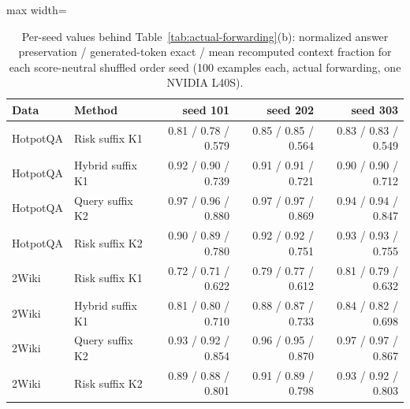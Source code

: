 \begin{table}[t]
\centering
\footnotesize
\begin{adjustbox}{max width=\textwidth}
\begin{tabular}{llrrr}
\toprule
Data & Method & seed 101 & seed 202 & seed 303 \\
\midrule
HotpotQA & Risk suffix K1 & 0.81 / 0.78 / 0.579 & 0.85 / 0.85 / 0.564 & 0.83 / 0.83 / 0.549 \\
HotpotQA & Hybrid suffix K1 & 0.92 / 0.90 / 0.739 & 0.91 / 0.91 / 0.721 & 0.90 / 0.90 / 0.712 \\
HotpotQA & Query suffix K2 & 0.97 / 0.96 / 0.880 & 0.97 / 0.97 / 0.869 & 0.94 / 0.94 / 0.847 \\
HotpotQA & Risk suffix K2 & 0.90 / 0.89 / 0.780 & 0.92 / 0.92 / 0.751 & 0.93 / 0.93 / 0.755 \\
\midrule
2Wiki & Risk suffix K1 & 0.72 / 0.71 / 0.622 & 0.79 / 0.77 / 0.612 & 0.81 / 0.79 / 0.632 \\
2Wiki & Hybrid suffix K1 & 0.81 / 0.80 / 0.710 & 0.88 / 0.87 / 0.733 & 0.84 / 0.82 / 0.698 \\
2Wiki & Query suffix K2 & 0.93 / 0.92 / 0.854 & 0.96 / 0.95 / 0.870 & 0.97 / 0.97 / 0.867 \\
2Wiki & Risk suffix K2 & 0.89 / 0.88 / 0.801 & 0.91 / 0.89 / 0.798 & 0.93 / 0.92 / 0.803 \\
\bottomrule
\end{tabular}
\end{adjustbox}
\caption{Per-seed values behind Table~\ref{tab:actual-forwarding}(b): normalized answer preservation / generated-token exact / mean recomputed context fraction for each score-neutral shuffled order seed (100 examples each, actual forwarding, one NVIDIA L40S).}
\label{tab:app-neutral-seed}
\end{table}

